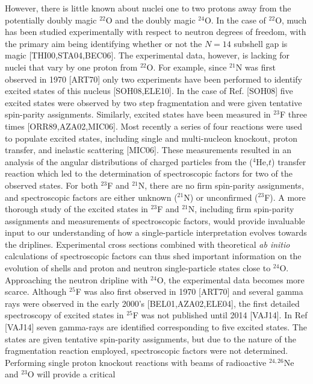 \documentclass[prc,preprint,superscriptaddress,showpacs,floatfix]{revtex4-1}
\begin{document}
However, there is little known about nuclei one to two protons away
from the potentially doubly magic $^{22}$O and the doubly magic
$^{24}$O.  In the case of $^{22}$O, much has been studied
experimentally with respect to neutron degrees of freedom, with the
primary aim being identifying whether or not the $N=14$ subshell gap
is magic [THI00,STA04,BEC06]. The experimental data, however, is
lacking for nuclei that vary by one proton from $^{22}$O. For example,
since $^{21}$N was first observed in 1970 [ART70] only two experiments
have been performed to identify excited states of this nucleus
[SOH08,ELE10]. In the case of Ref. [SOH08] five excited states were
observed by two step fragmentation and were given tentative
spin-parity assignments. Similarly, excited states have been measured
in $^{23}$F three times [ORR89,AZA02,MIC06]. Most recently a series of
four reactions were used to populate excited states, including single
and multi-nucleon knockout, proton transfer, and inelastic scattering
[MIC06]. These measurements resulted in an analysis of the angular
distributions of charged particles from the ($^{4}$He,$t$) transfer
reaction which led to the determination of spectroscopic factors for
two of the observed states. For both $^{23}$F and $^{21}$N, there are
no firm spin-parity assignments, and spectroscopic factors are either
unknown ($^{21}$N) or unconfirmed ($^{23}$F).  A more thorough study
of the excited states in $^{23}$F and $^{21}$N, including firm
spin-parity assignments and measurements of spectroscopic factors,
would provide invaluable input to our understanding of how a
single-particle interpretation evolves towards the
driplines. Experimental cross sections combined with theoretical {\em
  ab initio} calculations of spectroscopic factors can thus shed
important information on the evolution of shells and proton and
neutron single-particle states close to $^{24}$O.  Approaching the
neutron dripline with $^{24}$O, the experimental data becomes more
scarce. Although $^{25}$F was also first observed in 1970 [ART70] and
several gamma rays were observed in the early 2000’s
[BEL01,AZA02,ELE04], the first detailed spectroscopy of excited states
in $^{25}$F was not published until 2014 [VAJ14]. In Ref [VAJ14] seven
gamma-rays are identified corresponding to five excited states.  The
states are given tentative spin-parity assignments, but due to the
nature of the fragmentation reaction employed, spectroscopic factors
were not determined.  Performing single proton knockout reactions with
beams of radioactive $^{24,26}$Ne and $^{23}$O will provide a critical
\end{document}
